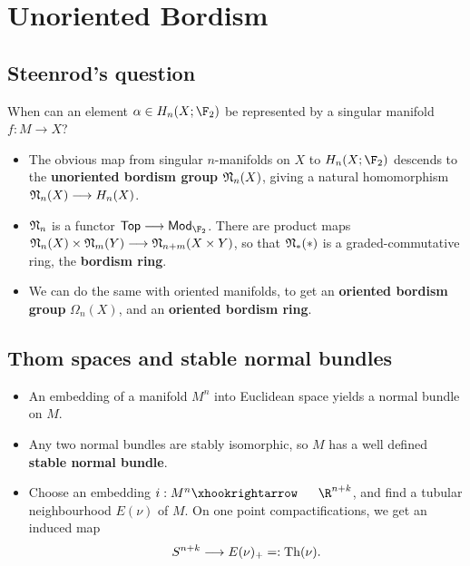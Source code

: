 \documentclass[11pt]{article}
\begin{document}
\section{Unoriented Bordism}
\subsection{Steenrod's question}
\begin{shaded}
When can an element $\alpha\in {H}_{n}(X;\F_2)$ be represented by a singular manifold $f:M\to X$?
\end{shaded}
\begin{itemize}\squishlist
\item The obvious map from singular $n$-manifolds on $X$ to ${H}_{n}(X;\F_2)$ descends to the \textbf{unoriented bordism group} $\mathfrak{N}_n(X)$, giving a natural homomorphism $\mathfrak{N}_n(X)\longrightarrow H_n(X)$.
\item $\mathfrak{N}_n$ is a functor $\Top\to\mathsf{Mod}_{\F_2}$. There are product maps $\mathfrak{N}_n(X)\times\mathfrak{N}_m(Y)\longrightarrow\mathfrak{N}_{n+m}(X\times Y)$, so that $\mathfrak{N}_*(*)$ is a graded-commutative ring, the \textbf{bordism ring}.
\item We can do the same with oriented manifolds, to get an \textbf{oriented bordism group} $\Omega_n(X)$, and an \textbf{oriented bordism ring}.
\end{itemize}
\subsection{Thom spaces and stable normal bundles}
\begin{itemize}\squishlist
\item An embedding of a manifold $M^n$ into Euclidean space yields a normal bundle on $M$.
\item Any two normal bundles are stably isomorphic, so $M$ has a well defined \textbf{stable normal bundle}.
\item Choose an embedding $i:M^n\cofibration \R^{n+k}$, and find a tubular neighbourhood $E(\nu)$ of $M$. On one point compactifications, we get an induced map
\[S^{n+k}\longrightarrow E(\nu)_+=:\operatorname{Th}(\nu).\]
\end{itemize}
\end{document}
